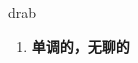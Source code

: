 
\begin{frame}
{\huge drab}
\begin{center}
\begin{enumerate}\Large
  \item \textbf{单调的，无聊的}
\end{enumerate}
\end{center}
\end{frame}
